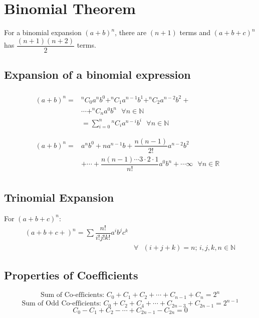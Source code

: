 \documentclass[openany, oneside]{book}
\begin{document}
\large{\chapter{Binomial Theorem}}
For a binomial expansion $(a+b)^n$, there are $(n+1)$ terms and $(a+b+c)^n$ has $\dfrac{(n+1)(n+2)}{2}$ terms.
\section{Expansion of a binomial expression\newline}
\begin{eqnarray}
\begin{aligned}
\begin{split}
(a+b)^n= & ^nC_0 a^n b^0+^nC_1 a^{n-1} b^1+^nC_2 a^{n-2} b^2+ & \\ & \cdots+^nC_n a^0 b^n\text{ }\forall n \in \mathbb{N} & \\ & =\sum_{i=0}^{n} {^nC_{i}} a^{n-i} b^i\text{ }\forall n \in \mathbb{N}
\end{split}
\end{aligned}\\
\begin{aligned}
\begin{split}
(a+b)^n= & a^n b^0+na^{n-1}b+\dfrac{n(n-1)}{2!}a^{n-2}b^2 & \\ & +\cdots+\dfrac{n(n-1)\cdots3\cdot2\cdot1}{n!} a^0 b^n+\cdots\infty \text{ }\forall n \in \mathbb{R}
\end{split}
\end{aligned}
\end{eqnarray}

\section{Trinomial Expansion}
For $(a+b+c)^n$:
\begin{equation}
\begin{split}
(a+b+c+)^n=\sum \dfrac{n!}{i! j! k!} a^i b^j c^k & \\ & \forall\text{ }(i+j+k)=n\text{; }i,j,k,n \in \mathbb{N}
\end{split}
\end{equation}

\section{Properties of Coefficients}
\begin{equation}
\text{Sum of Co-efficients: }C_0+C_1+C_2+\cdots+C_{n-1}+C_n=2^n
\end{equation}
\begin{equation}
\text{Sum of Odd Co-efficients: }C_0+C_2+C_4+\cdots+C_{2n-3}+C_{2n-1}=2^{n-1}
\end{equation}
\begin{equation}
C_0-C_1+C_2-\cdots+C_{2n-1}-C_{2n}=0
\end{equation}
\end{document}
